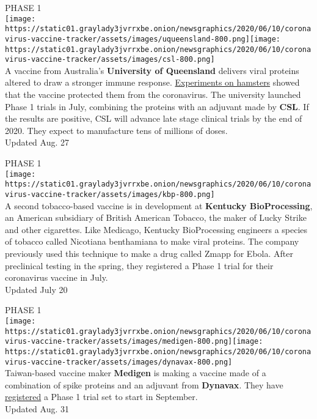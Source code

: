 PHASE 1\\
\texttt{[image: https://static01.graylady3jvrrxbe.onion/newsgraphics/2020/06/10/coronavirus-vaccine-tracker/assets/images/uqueensland-800.png]}\texttt{[image: https://static01.graylady3jvrrxbe.onion/newsgraphics/2020/06/10/coronavirus-vaccine-tracker/assets/images/csl-800.png]}\\
A vaccine from Australia's \textbf{University of Queensland} delivers
viral proteins altered to draw a stronger immune response.
\href{https://www.uq.edu.au/news/article/2020/08/uq-vaccine-scientists-report-positive-results-pre-clinical-testing}{Experiments
on hamsters} showed that the vaccine protected them from the
coronavirus. The university launched Phase 1 trials in July, combining
the proteins with an adjuvant made by \textbf{CSL}. If the results are
positive, CSL will advance late stage clinical trials by the end of
2020. They expect to manufacture tens of millions of doses.\\
Updated Aug. 27

PHASE 1\\
\texttt{[image: https://static01.graylady3jvrrxbe.onion/newsgraphics/2020/06/10/coronavirus-vaccine-tracker/assets/images/kbp-800.png]}\\
A second tobacco-based vaccine is in development at \textbf{Kentucky
BioProcessing}, an American subsidiary of British American Tobacco, the
maker of Lucky Strike and other cigarettes. Like Medicago, Kentucky
BioProcessing engineers a species of tobacco called Nicotiana
benthamiana to make viral proteins. The company previously used this
technique to make a drug called Zmapp for Ebola. After preclinical
testing in the spring, they registered a Phase 1 trial for their
coronavirus vaccine in July.\\
Updated July 20

PHASE 1\\
\texttt{[image: https://static01.graylady3jvrrxbe.onion/newsgraphics/2020/06/10/coronavirus-vaccine-tracker/assets/images/medigen-800.png]}\texttt{[image: https://static01.graylady3jvrrxbe.onion/newsgraphics/2020/06/10/coronavirus-vaccine-tracker/assets/images/dynavax-800.png]}\\
Taiwan-based vaccine maker \textbf{Medigen} is making a vaccine made of
a combination of spike proteins and an adjuvant from \textbf{Dynavax}.
They have
\href{https://clinicaltrials.gov/ct2/show/NCT04487210?term=vaccine\&recrs=abdf\&cond=COVID-19\&phase=0123\&sort=nwst\&draw=2\&rank=5}{registered}
a Phase 1 trial set to start in September.\\
Updated Aug. 31

